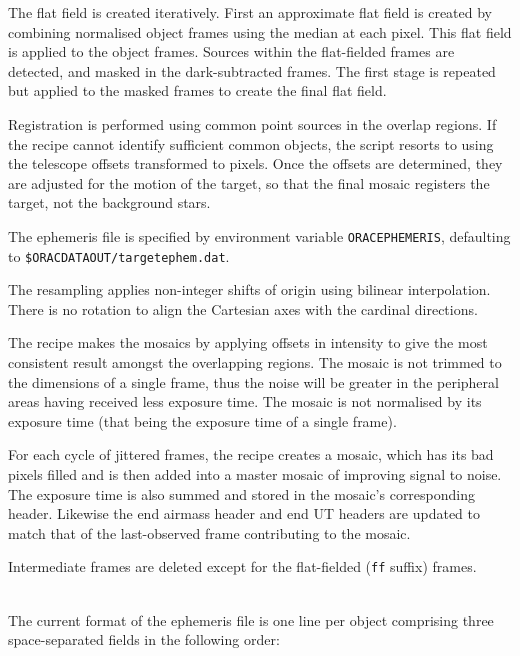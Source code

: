 \documentclass[twoside,11pt]{article}
\renewcommand{\_}{\texttt{\symbol{95}}}
\newcommand{\sstdiytopic}[2]{\goodbreak \item[{\hspace{-0.35em}#1\hspace{-0.35em}:}] \mbox{} \\[1.3ex] #2}
\newcommand{\ssthitemlist}[1]{
  \mbox{} \\
  \vspace{-3.5ex}
  \begin{itemize}
     #1
  \end{itemize}
}
\newcommand{\sstitem}{\item}
\newcommand{\sstdiytopic}[2]{\item[{#1}:]
      \begin{description}
         #2
      \end{description}
      \\
   }
\newcommand{\ssthitemlist}[1]{
      \begin{itemize}
         #1
      \end{itemize}
      \\
   }
\begin{document}
{{{         \sstitem
         The flat field is created iteratively.  First an approximate
         flat field is created by combining normalised object frames using
         the median at each pixel.  This flat field is applied to the object
         frames.  Sources within the flat-fielded frames are detected, and
         masked in the dark-subtracted frames.  The first stage is repeated
         but applied to the masked frames to create the final flat field.

         \sstitem
         Registration is performed using common point sources in the
         overlap regions.  If the recipe cannot identify sufficient common
         objects, the script resorts to using the telescope offsets
         transformed to pixels.  Once the offsets are determined, they
         are adjusted for the motion of the target, so that the final
         mosaic registers the target, not the background stars.

         \sstitem
         The ephemeris file is specified by environment variable
         {\tt{ORAC\_EPHEMERIS}}, defaulting to {\tt\$ORAC\_DATA\_OUT/target\_ephem.dat}.

         \sstitem
         The resampling applies non-integer shifts of origin using
         bilinear interpolation.  There is no rotation to align the
         Cartesian axes with the cardinal directions.

         \sstitem
         The recipe makes the mosaics by applying offsets in intensity
         to give the most consistent result amongst the overlapping regions.
         The mosaic is not trimmed to the dimensions of a single frame, thus
         the noise will be greater in the peripheral areas having received
         less exposure time.  The mosaic is not normalised by its exposure
         time (that being the exposure time of a single frame).

         \sstitem
         For each cycle of jittered frames, the recipe creates a mosaic,
         which has its bad pixels filled and is then added into a master
         mosaic of improving signal to noise.  The exposure time is also
         summed and stored in the mosaic's corresponding header.
	 Likewise the end airmass header and end UT headers are
	 updated to match that of the last-observed frame contributing
	 to the mosaic.

         \sstitem
         Intermediate frames are deleted except for the flat-fielded ({\tt\_ff}
         suffix) frames.
      }
   }
   \label{mjsf_ephem_format}
   \sstdiytopic{
      Ephemeris-file Format
   }{
      The current format of the ephemeris file is one line per object
      comprising three space-separated fields in the following order:
      \ssthitemlist{

}}}
\end{document}
